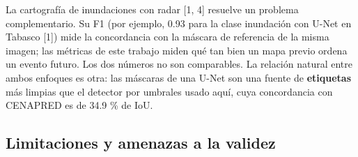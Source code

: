 La cartografía de inundaciones con radar {[}1, 4{]} resuelve un problema complementario. Su F1 (por ejemplo, 0.93 para la clase inundación con U-Net en Tabasco {[}1{]}) mide la concordancia con la máscara de referencia de la misma imagen; las métricas de este trabajo miden qué tan bien un mapa previo ordena un evento futuro. Los dos números no son comparables. La relación natural entre ambos enfoques es otra: las máscaras de una U-Net son una fuente de \textbf{etiquetas} más limpias que el detector por umbrales usado aquí, cuya concordancia con CENAPRED es de 34.9 \% de IoU.

\subsection{Limitaciones y amenazas a la validez}


